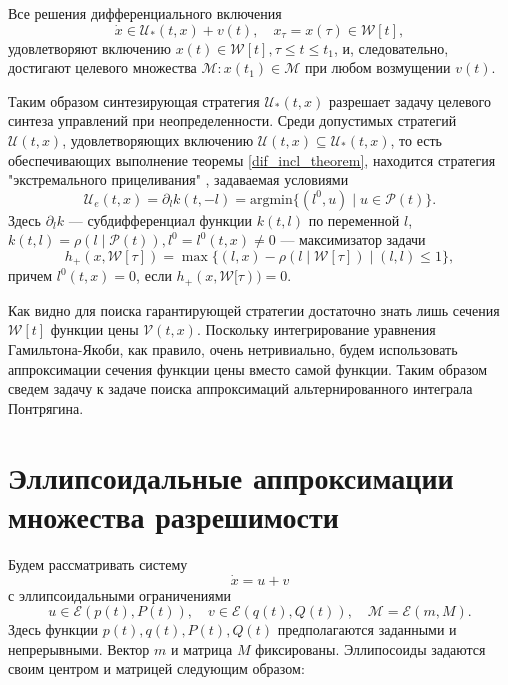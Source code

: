 \begin{theorem}\label{dif_incl_theorem}
    Все решения дифференциального включения
    \begin{equation*}
        \dot{x} \in \mathcal{U}_*(t,x) + v(t), \quad x_{\tau} = x(\tau) \in \mathcal{W}[t],
    \end{equation*}
    удовлетворяют включению \( x(t) \in \mathcal{W}[t] , \tau \le t \le t_1 \), и, следовательно,
     достигают целевого множества \( \mathcal{M} : x(t_1) \in \mathcal{M} \) при любом возмущении
     \( v(t) \). 
\end{theorem}

Таким образом синтезирующая стратегия \( \mathcal{U}_*(t,x) \) разрешает задачу целевого синтеза 
 управлений при неопределенности. Среди допустимых стратегий \( \mathcal{U}(t,x) \), удовлетворяющих
 включению \( \mathcal{U}(t,x) \subseteq \mathcal{U}_*(t,x) \), то есть обеспечивающих выполнение
 теоремы \eqref{dif_incl_theorem}, находится стратегия "экстремального прицеливания" , задаваемая
 условиями
\begin{equation}
    \mathcal{U}_e(t,x) = \partial_l k(t, -l) = \mathrm{arg min} \{(l^0, u) \mid u \in \mathcal{P}(t) \}.
\end{equation}
Здесь \( \partial_l k \) --- субдифференциал функции \( k(t, l) \) по переменной \( l \), \( k(t,l)
 = \rho(l \mid \mathcal{P}(t)), l^0 = l^0(t, x) \ne 0 \) --- максимизатор задачи 
\begin{equation}
    h_+(x, \mathcal{W}[\tau]) = \max \{(l,x) - \rho(l \mid \mathcal{W}[\tau]) \mid (l,l) \le 1 \},
\end{equation}
причем \( l^0(t,x) = 0 \), если \( h_+(x, \mathcal{W}[\tau)) = 0 \).

Как видно для поиска гарантирующей стратегии достаточно знать лишь сечения \( \mathcal{W}[t] \) функции
 цены \( \mathcal{V}(t,x) \). Поскольку интегрирование уравнения Гамильтона-Якоби, как правило, очень 
 нетривиально, будем использовать аппроксимации сечения функции цены вместо самой функции. Таким 
 образом сведем задачу к задаче поиска аппроксимаций альтернированного интеграла Понтрягина.

\section{Эллипсоидальные аппроксимации множества разрешимости}
Будем рассматривать систему
\begin{equation*}
    \dot{x} = u + v
\end{equation*}
с эллипсоидальными ограничениями
\begin{equation*}
    u \in \mathcal{E}(p(t), P(t)), \quad v \in \mathcal{E}(q(t), Q(t)), \quad \mathcal{M} = 
     \mathcal{E}(m, M).
\end{equation*}
Здесь функции \( p(t), q(t), P(t), Q(t) \) предполагаются заданными и непрерывными. Вектор \( m \) и
 матрица \( M \) фиксированы. Эллипосоиды задаются своим центром и матрицей следующим образом:
 
